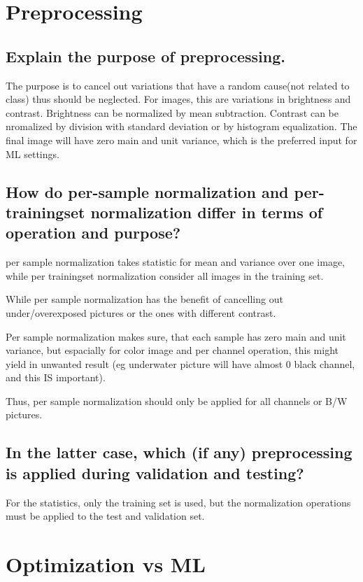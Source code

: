 \section{Preprocessing}
\subsection{Explain the purpose of preprocessing.}

The purpose is to cancel out variations that have a random cause(not related to class) thus should be neglected. For images, this are variations in brightness and contrast. Brightness can be normalized by mean subtraction. Contrast can be nromalized by division with standard deviation or by histogram equalization. The final image will have zero main and unit variance, which is the preferred input for ML settings.

\subsection{How do per-sample normalization and per-trainingset normalization differ in terms of operation and purpose?}

per sample normalization takes statistic for mean and variance over one image, while per trainingset normalization consider all images in the training set.

While per sample normalization has the benefit of cancelling out under/overexposed pictures or the ones with different contrast.

Per sample normalization makes sure, that each sample has zero main and unit variance, but espacially for color image and per channel operation, this might yield in unwanted result (eg underwater picture will have almost 0 black channel, and this IS important).

Thus, per sample normalization should only be applied for all channels or B/W pictures.

\subsection{In the latter case, which (if any) preprocessing is applied during validation and testing?}

For the statistics, only the training set is used, but the normalization operations must be applied to the test and validation set.

\section{Optimization vs ML}
